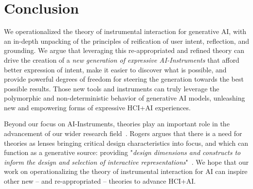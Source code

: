 \section{Conclusion}
We operationalized the theory of instrumental interaction for generative AI, with an in-depth unpacking of the principles of reification of user intent, reflection, and grounding. We argue that leveraging this re-appropriated and refined theory can drive the creation of a \textit{new generation of expressive AI-Instruments} that afford better expression of intent, make it easier to discover what is possible, and provide powerful degrees of freedom for steering the generation towards the best possible results. Those new tools and instruments can truly leverage the polymorphic and non-deterministic behavior of generative AI models, unleashing new and empowering forms of expressive HCI+AI experiences. 

Beyond our focus on AI-Instruments, theories play an important role in the advancement of our wider research field~\cite{rogers_hci_2012, halverson_activity_2002}. Rogers argues that there is a need for theories as lenses bringing critical design characteristics into focus, and which can function as a generative source: providing "\textit{design dimensions and constructs to inform the design and selection of interactive representations}"~\cite{rogers_new_2004}. We hope that our work on operationalizing the theory of instrumental interaction for AI can inspire other new -- and re-appropriated -- theories to advance HCI+AI. 








